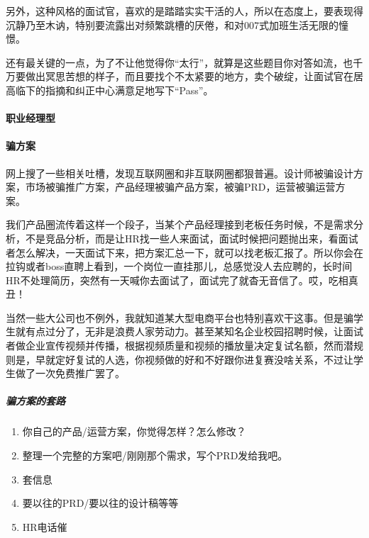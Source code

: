 \documentclass[letterpaper,11pt,english]{sphinxmanual}
\begin{document}
另外，这种风格的面试官，喜欢的是踏踏实实干活的人，所以在态度上，要表现得沉静乃至木讷，特别要流露出对频繁跳槽的厌倦，和对007式加班生活无限的憧憬。

还有最关键的一点，为了不让他觉得你“太行”，就算是这些题目你对答如流，也千万要做出冥思苦想的样子，而且要找个不太紧要的地方，卖个破绽，让面试官在居高临下的指摘和纠正中心满意足地写下“Pass”。


\paragraph{职业经理型}
\label{\detokenize{chapter_interview/interviewer:id4}}

\paragraph{骗方案}
\label{\detokenize{chapter_interview/interviewer:id5}}
网上搜了一些相关吐槽，发现互联网圈和非互联网圈都狠普遍。设计师被骗设计方案，市场被骗推广方案，产品经理被骗产品方案，被骗PRD，运营被骗运营方案。

我们产品圈流传着这样一个段子，当某个产品经理接到老板任务时候，不是需求分析，不是竞品分析，而是让HR找一些人来面试，面试时候把问题抛出来，看面试者怎么解决，一天面试下来，把方案汇总一下，就可以找老板汇报了。所以你会在拉钩或者boss直聘上看到，一个岗位一直挂那儿，总感觉没人去应聘的，长时间HR不处理简历，突然有一天喊你去面试了，面试完了就杳无音信了。哎，吃相真丑！

当然一些大公司也不例外，我就知道某大型电商平台也特别喜欢干这事。但是骗学生就有点过分了，无非是浪费人家劳动力。甚至某知名企业校园招聘时候，让面试者做企业宣传视频并传播，根据视频质量和视频的播放量决定复试名额，然而潜规则是，早就定好复试的人选，你视频做的好和不好跟你进复赛没啥关系，不过让学生做了一次免费推广罢了。


\subparagraph{骗方案的套路}
\label{\detokenize{chapter_interview/interviewer:id6}}\begin{enumerate}
%
\item {} 
你自己的产品/运营方案，你觉得怎样？怎么修改？

\item {} 
整理一个完整的方案吧/刚刚那个需求，写个PRD发给我吧。

\item {} 
套信息

\item {} 
要以往的PRD/要以往的设计稿等等

\item {} 
HR电话催

\end{enumerate}
\end{document}
